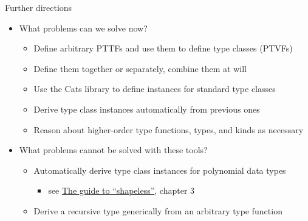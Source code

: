 \documentclass[english]{beamer}
\newenvironment{lyxcode}
   {\par\begin{list}{}{
     \setlength{\rightmargin}{\leftmargin}
     \setlength{\listparindent}{0pt}%
     \raggedright
     \setlength{\itemsep}{0pt}
     \setlength{\parsep}{0pt}
     \normalfont\ttfamily}%
    \def\{{\char`\{}
    \def\}{\char`\}}
    \def\textasciitilde{\char`\~}
    \item[]}
   {\end{list}}
\begin{document}
\begin{frame}{Further directions}

\begin{itemize}
\item What problems can we solve now?
\begin{itemize}
\item Define arbitrary PTTFs and use them to define type classes (PTVFs) 
\item Define them together or separately, combine them at will
\item Use the Cats library to define instances for standard type classes
\item Derive type class instances automatically from previous ones
\item Reason about higher-order type functions, types, and kinds as necessary
\end{itemize}
\item What problems cannot be solved with these tools?
\begin{itemize}
\item Automatically derive type class instances for polynomial data types
\begin{itemize}
\item see \href{https://github.com/underscoreio/shapeless-guide}{The guide to ``shapeless''},
chapter 3
\end{itemize}
\item Derive a recursive type generically from an arbitrary type function
\end{itemize}
\end{itemize}
\end{frame}
\end{document}
